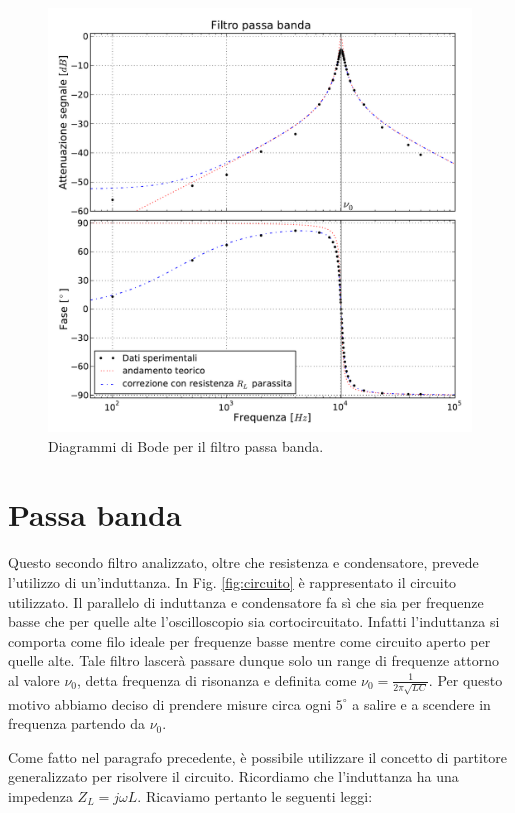 \begin{figure}
    \includegraphics[width=120mm]{bpf.pdf}
    \caption{Diagrammi di Bode per il filtro passa banda.}
    \label{fig:bpf}
\end{figure}

\section{Passa banda}
Questo secondo filtro analizzato, oltre che resistenza e condensatore, prevede l'utilizzo di un'induttanza. In Fig. \ref{fig:circuito} è rappresentato il circuito utilizzato. Il parallelo di induttanza e condensatore fa sì che sia per frequenze basse che per quelle alte l'oscilloscopio sia cortocircuitato. Infatti l'induttanza si comporta come filo ideale per frequenze basse mentre come circuito aperto per quelle alte. Tale filtro lascerà passare dunque solo un range di frequenze attorno al valore $\nu_0$, detta frequenza di risonanza e definita come $\nu_0=\frac{1}{2 \pi \sqrt{LC}}$. Per questo motivo abbiamo deciso di prendere misure circa ogni $5^\circ$ a salire e a scendere in frequenza partendo da $\nu_0$.

Come fatto nel paragrafo precedente, è possibile utilizzare il concetto di partitore generalizzato per risolvere il circuito. Ricordiamo che l'induttanza ha una impedenza $Z_L=j\omega L$. Ricaviamo pertanto le seguenti leggi:

